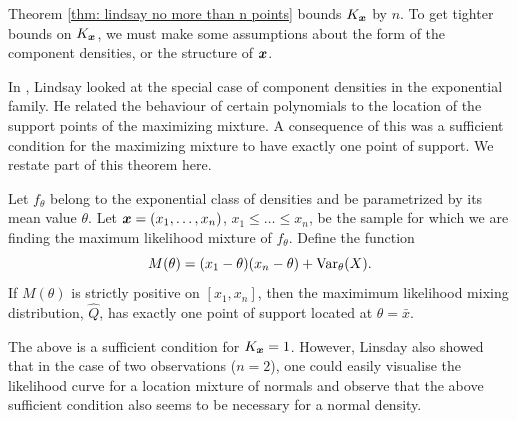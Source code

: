 	Theorem \ref{thm: lindsay no more than n points} bounds $K_{\bm{{x}}}$ by $n$. To get tighter bounds on $K_{\bm{{x}}}$, we must make some assumptions about the form of the component densities, or the structure of ${\bm{{x}}}$.

	In \cite{Lindsay1983a-he}, Lindsay looked at the special case of component densities in the exponential family. He related the behaviour of certain polynomials to the location of the support points of the maximizing mixture. A consequence of this was a sufficient condition for the maximizing mixture to have exactly one point of support. We restate part of this theorem here.

	\begin{theorem}
	\label{thm:exponential family k=1 bound}
		Let $f_\theta$ belong to the exponential class of densities and be parametrized by its mean value $\theta$. Let ${\bm{{x}}} = (x_1, \dots, x_n)$, $x_1 \leq \dots \leq x_n$, be the sample for which we are finding the maximum likelihood mixture of $f_\theta$. Define the function
		\begin{equation}
			M(\theta) = (x_1 - \theta)(x_n - \theta) + \mathrm{Var}_\theta(X).
		\end{equation}
		If $M(\theta)$ is strictly positive on $[x_1, x_n]$, then the maximimum likelihood mixing distribution, $\hat{Q}$, has exactly one point of support located at $\theta = \bar{x}$.
	\end{theorem}

	The above is a sufficient condition for $K_{\bm{{x}}} = 1$. However, Linsday also showed that in the case of two observations ($n=2$), one could easily visualise the likelihood curve for a location mixture of normals and observe that the above sufficient condition also seems to be necessary for a normal density. 

